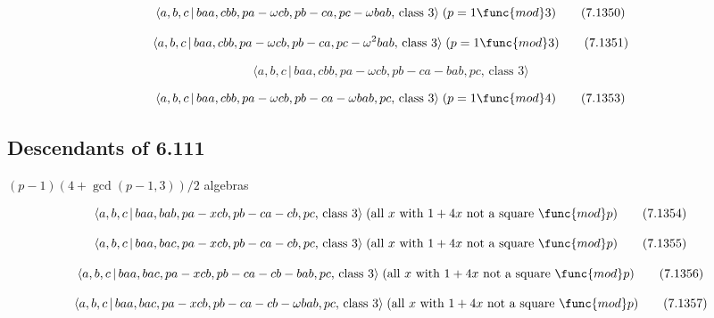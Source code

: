 \documentclass[10pt]{article}
\begin{document}
\begin{equation}
\langle a,b,c\,|\,baa,cbb,pa-\omega cb,pb-ca,pc-\omega bab,\,\text{class }%
3\rangle \;(p=1\func{mod}3)  \tag{7.1350}
\end{equation}

\begin{equation}
\langle a,b,c\,|\,baa,cbb,pa-\omega cb,pb-ca,pc-\omega ^{2}bab,\,\text{class 
}3\rangle \;(p=1\func{mod}3)  \tag{7.1351}
\end{equation}

\begin{equation}
\langle a,b,c\,|\,baa,cbb,pa-\omega cb,pb-ca-bab,pc,\,\text{class }3\rangle 
\tag{7.1352}
\end{equation}

\begin{equation}
\langle a,b,c\,|\,baa,cbb,pa-\omega cb,pb-ca-\omega bab,pc,\,\text{class }%
3\rangle \;(p=1\func{mod}4)  \tag{7.1353}
\end{equation}

\subsection{Descendants of 6.111}

$(p-1)(4+\gcd (p-1,3))/2$ algebras

\begin{equation}
\langle a,b,c\,|\,baa,bab,pa-xcb,pb-ca-cb,pc,\,\text{class }3\rangle \;(%
\text{all }x\text{ with }1+4x\text{ not a square }\func{mod}p)  \tag{7.1354}
\end{equation}

\begin{equation}
\langle a,b,c\,|\,baa,bac,pa-xcb,pb-ca-cb,pc,\,\text{class }3\rangle \;(%
\text{all }x\text{ with }1+4x\text{ not a square }\func{mod}p)  \tag{7.1355}
\end{equation}

\begin{equation}
\langle a,b,c\,|\,baa,bac,pa-xcb,pb-ca-cb-bab,pc,\,\text{class }3\rangle \;(%
\text{all }x\text{ with }1+4x\text{ not a square }\func{mod}p)  \tag{7.1356}
\end{equation}

\begin{equation}
\langle a,b,c\,|\,baa,bac,pa-xcb,pb-ca-cb-\omega bab,pc,\,\text{class }%
3\rangle \;(\text{all }x\text{ with }1+4x\text{ not a square }\func{mod}p) 
\tag{7.1357}
\end{equation}
\end{document}
